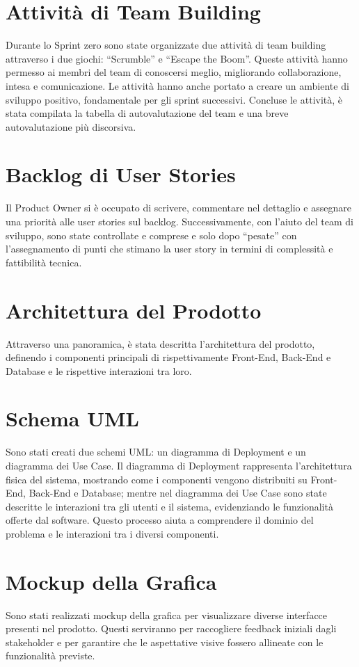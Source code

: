 \documentclass{article}
\begin{document}
\section{Attività di Team Building}
Durante lo Sprint zero sono state organizzate due attività di team building attraverso i due giochi: “Scrumble” e “Escape the Boom”. Queste attività hanno permesso ai membri del team di conoscersi meglio, migliorando collaborazione, intesa e comunicazione. Le attività hanno anche portato a creare un ambiente di sviluppo positivo, fondamentale per gli sprint successivi. Concluse le attività, è stata compilata la tabella di autovalutazione del team e una breve autovalutazione più discorsiva.

\section{Backlog di User Stories}
Il Product Owner si è occupato di scrivere, commentare nel dettaglio e assegnare una priorità alle user stories sul backlog. Successivamente, con l’aiuto del team di sviluppo, sono state controllate e comprese e solo dopo “pesate” con l’assegnamento di punti che stimano la user story in termini di complessità e fattibilità tecnica.

\section{Architettura del Prodotto}
Attraverso una panoramica, è stata descritta l’architettura del prodotto, definendo i componenti principali di rispettivamente Front-End, Back-End e Database e le rispettive interazioni tra loro.

\section{Schema UML}
Sono stati creati due schemi UML: un diagramma di Deployment e un diagramma dei Use Case. Il diagramma di Deployment rappresenta l’architettura fisica del sistema, mostrando come i componenti vengono distribuiti su Front-End, Back-End e Database; mentre nel diagramma dei Use Case sono state descritte le interazioni tra gli utenti e il sistema, evidenziando le funzionalità offerte dal software. Questo processo aiuta a comprendere il dominio del problema e le interazioni tra i diversi componenti.

\section{Mockup della Grafica}
Sono stati realizzati mockup della grafica per visualizzare diverse interfacce presenti nel prodotto. Questi serviranno per raccogliere feedback iniziali dagli stakeholder e per garantire che le aspettative visive fossero allineate con le funzionalità previste.
\end{document}

